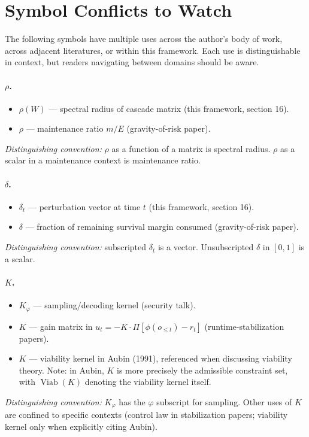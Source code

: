 \documentclass[11pt]{article}
\DeclareMathOperator{\Viab}{Viab}
\begin{document}
\section{Symbol Conflicts to Watch}\label{sec:conflicts}

The following symbols have multiple uses across the author's body of work, across adjacent literatures, or within this framework. Each use is distinguishable in context, but readers navigating between domains should be aware.

\paragraph{$\rho$.}
\begin{itemize}
\item $\rho(W)$ --- spectral radius of cascade matrix (this framework, section 16).
\item $\rho$ --- maintenance ratio $m/E$ (gravity-of-risk paper).
\end{itemize}
\textit{Distinguishing convention:} $\rho$ as a function of a matrix is spectral radius. $\rho$ as a scalar in a maintenance context is maintenance ratio.

\paragraph{$\delta$.}
\begin{itemize}
\item $\delta_t$ --- perturbation vector at time $t$ (this framework, section 16).
\item $\delta$ --- fraction of remaining survival margin consumed (gravity-of-risk paper).
\end{itemize}
\textit{Distinguishing convention:} subscripted $\delta_t$ is a vector. Unsubscripted $\delta$ in $[0, 1]$ is a scalar.

\paragraph{$K$.}
\begin{itemize}
\item $K_\varphi$ --- sampling/decoding kernel (security talk).
\item $K$ --- gain matrix in $u_t = -K \cdot \Pi[\phi(o_{\le t}) - r_t]$ (runtime-stabilization papers).
\item $K$ --- viability kernel in Aubin (1991), referenced when discussing viability theory. Note: in Aubin, $K$ is more precisely the admissible constraint set, with $\Viab(K)$ denoting the viability kernel itself.
\end{itemize}
\textit{Distinguishing convention:} $K_\varphi$ has the $\varphi$ subscript for sampling. Other uses of $K$ are confined to specific contexts (control law in stabilization papers; viability kernel only when explicitly citing Aubin).
\end{document}
